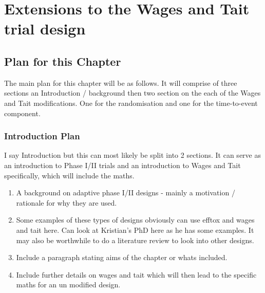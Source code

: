 
\chapter{Extensions to the Wages and Tait trial design} %

\label{WT} %


\section{Plan for this Chapter}

The main plan for this chapter will be as follows. It will comprise of three sections an Introduction / background then two section on the each of the Wages and Tait modifications. One for the randomisation and one for the time-to-event component. 

\subsection{Introduction Plan}

I say Introduction but this can most likely be split into 2 sections. It can serve as an introduction to Phase I/II trials and an introduction to Wages and Tait specifically, which will include the maths. 

\begin{enumerate}
	\item A background on adaptive phase I/II designs - mainly a motivation / rationale for why they are used.
	\item Some examples of these types of designs obviously can use efftox and wages and tait here. Can look at Kristian's PhD here as he has some examples. It may also be worthwhile to do a literature review to look into other designs. 
	\item Include a paragraph stating aims of the chapter or whats included.
	\item Include further details on wages and tait which will then lead to the specific maths for an un modified design.
\end{enumerate}


